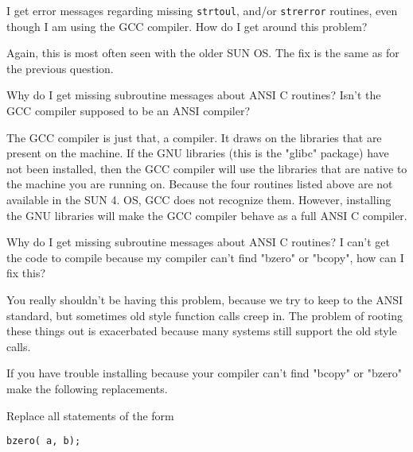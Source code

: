 {{{{{{{\begin{question}
I get error messages regarding missing
{\tt strtoul}, and/or {\tt strerror} routines, even though I am using
the {\sf GCC} compiler. How do I get around this problem?
\end{question}

\begin{rmans}
Again, this is  most often seen with the older {\sf SUN OS}. 
The fix is the same as for the previous question.
\end{rmans}

\begin{question}
\label{SU:q:gcc}
Why do I get missing subroutine messages about {\sf ANSI C} routines?
Isn't the {\sf GCC} compiler supposed to be an {\sf ANSI} compiler?
\end{question}

\begin{rmans}
The {\sf GCC} compiler is just that, a compiler. It
draws on the libraries that are present on the machine.
If the {\sf GNU} libraries (this is the "glibc" package)
have not been installed, then the
{\sf GCC} compiler will use the libraries that are native to the machine
you are running on. Because the four routines listed above are
not available in the {\sf SUN 4. OS}, {\sf GCC} does not recognize them.
However, installing the {\sf GNU} libraries will make the {\sf GCC} compiler
behave as a full {\sf ANSI C} compiler.
\end{rmans}

\begin{question}
\label{SU:q:bugs}
Why do I get missing subroutine messages about {\sf ANSI C} routines?
I can't get the code to compile because my compiler can't find
"bzero" or "bcopy", how can  I fix this?
\end{question}

\begin{rmans}
You really shouldn't be having this problem, because
we try to keep to the ANSI standard, but sometimes old
style function calls creep in. The problem of rooting these things out
is exacerbated because many systems still support the old style calls.

If you have trouble installing
because your compiler can't find "bcopy" or "bzero"
make the following replacements.

Replace all statements of the form

{\small \begin{verbatim}
bzero( a, b);
\end{verbatim}} \noindent


\end{rmans}}}}}}}}
